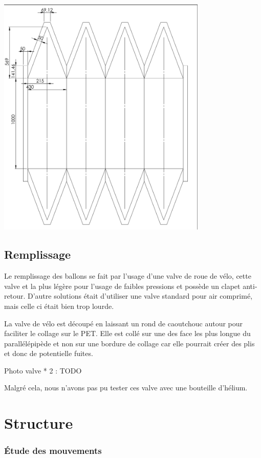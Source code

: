 \documentclass[a4paper,11pt]{article}
\begin{document}
\begin{center}
 \includegraphics[width=10cm]{../Images/plan_ballon.png}
\end{center}


\subsection{Remplissage}

Le remplissage des ballons se fait par l'usage d'une valve de roue de vélo, cette valve et la plus légère pour l'usage de faibles pressions et possède un clapet anti-retour. D'autre solutions était d'utiliser une valve standard pour air comprimé, mais celle ci était bien trop lourde.

La valve de vélo est découpé en laissant un rond de caoutchouc autour pour faciliter le collage sur le PET. Elle est collé sur une des face les plus longue du parallélépipède et non sur une bordure de collage car elle pourrait créer des plis et donc de potentielle fuites.

Photo valve * 2 : TODO

Malgré cela, nous n'avons pas pu tester ces valve avec une bouteille d'hélium.
\section{Structure}

\subsubsection{Étude des mouvements}
\end{document}
